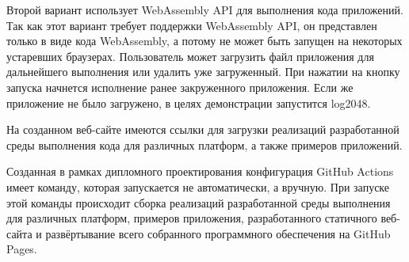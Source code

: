Второй вариант использует WebAssembly API для выполнения кода приложений.
Так как этот вариант требует поддержки WebAssembly API, он представлен только в виде кода WebAssembly, а потому не может быть запущен на некоторых устаревших браузерах.
Пользователь может загрузить файл приложения для дальнейшего выполнения или удалить уже загруженный.
При нажатии на кнопку запуска начнется исполнение ранее закруженного приложения. 
Если же приложение не было загружено, в целях демонстрации запустится log2048.

На созданном веб-сайте имеются ссылки для загрузки реализаций разработанной среды выполнения кода для различных платформ, а также примеров приложений.

Созданная в рамках дипломного проектирования конфигурация GitHub Actions имеет команду, которая запускается не автоматически, а вручную.
При запуске этой команды происходит сборка реализаций разработанной среды выполнения для различных платформ, примеров приложения, разработанного статичного веб-сайта и развёртывание всего собранного программного обеспечения на GitHub Pages.

